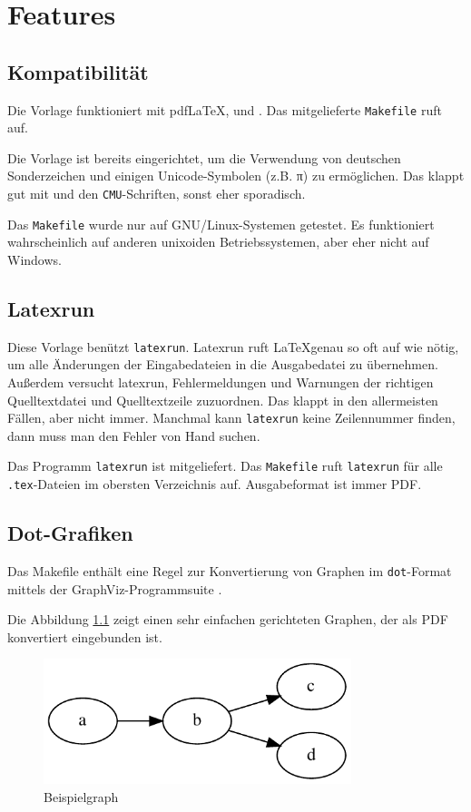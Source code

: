 \chapter{Features}

\section{Kompatibilität}

Die Vorlage funktioniert mit pdf\LaTeX, \XeLaTeX und \LuaLaTeX. Das mitgelieferte \texttt{Makefile}
ruft \XeLaTeX auf.

Die Vorlage ist bereits eingerichtet, um die Verwendung von deutschen Sonderzeichen und
einigen Unicode-Symbolen (z.B. π) zu ermöglichen. Das klappt gut mit \XeTeX und den
\texttt{CMU}-Schriften, sonst eher sporadisch.

Das \texttt{Makefile} wurde nur auf GNU/Linux-Systemen getestet. Es funktioniert wahrscheinlich
auf anderen unixoiden Betriebssystemen, aber eher nicht auf Windows.

\section{Latexrun}

Diese Vorlage benützt \texttt{latexrun}\cite{latexrun}.
Latexrun ruft \LaTeX genau so oft auf wie nötig,
um alle Änderungen der Eingabedateien in die Ausgabedatei zu übernehmen.
Außerdem versucht latexrun, Fehlermeldungen und Warnungen
der richtigen Quelltextdatei und Quelltextzeile zuzuordnen.
Das klappt in den allermeisten Fällen, aber nicht immer. Manchmal kann \texttt{latexrun}
keine Zeilennummer finden, dann muss man den Fehler von Hand suchen.

Das Programm \texttt{latexrun} ist mitgeliefert. Das \texttt{Makefile} ruft \texttt{latexrun}
für alle \texttt{.tex}-Dateien im obersten Verzeichnis auf. Ausgabeformat ist immer PDF.

\section{Dot-Grafiken}

Das Makefile enthält eine Regel zur Konvertierung von Graphen im \texttt{dot}-Format mittels
der GraphViz-Programmsuite \cite{gansner2000open}.

Die Abbildung \ref{fig:dotgraph} zeigt einen sehr einfachen gerichteten Graphen,
der als PDF konvertiert eingebunden ist.

\begin{figure}[!ht]
    \centering
    \caption{Beispielgraph}
    \label{fig:dotgraph}
    \includegraphics[width=0.8\textwidth]{img/examplegraph}
\end{figure}

